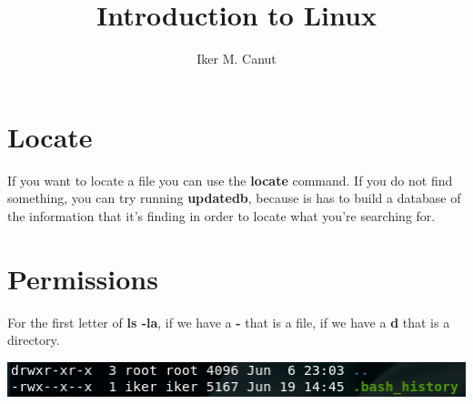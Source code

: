 \documentclass[11pt,a4paper]{article}
\author{Iker M. Canut}
\title{Introduction to Linux}
\begin{document}
\maketitle
\newpage

\section{Locate}
If you want to locate a file you can use the \textbf{locate} command. If you do not find something, you can try running \textbf{updatedb}, because is has to build a database of the information that it's finding in order to locate what you're searching for. 

\section{Permissions}
For the first letter of \textbf{ls -la}, if we have a \textbf{-} that is a file, if we have a \textbf{d} that is a directory.\\
\begin{center}
\includegraphics[scale=.75]{ls -la.png} 
\end{center}
\end{document}
